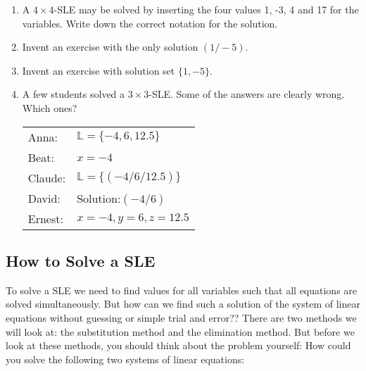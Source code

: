 \newpage
\begin{exer}$ $

\begin{enumerate}[label=\emph{\alph*})]
\item	A $4\times 4$-SLE may be solved by inserting the four values 1, -3, 4 and 17 for the variables. Write down the correct notation for the solution.
\vfill

\item	Invent an exercise with the only solution $(1 / -5)$.
\vfill

\item	Invent an exercise with solution set $\{1,-5\}$.
\vfill

\item	A few students solved a $3\times 3$-SLE. Some of the answers are clearly wrong. Which ones?

\begin{tabular}{ll}
Anna: & $\mathbb{L}=\{-4,6,12.5\}$\\ 
Beat: &$x=-4$\\ 
Claude:  &$\mathbb{L}=\{(-4/6/12.5)\}$\\
David:  &Solution:$(-4/6)$\\ 
Ernest:  &$x=-4, y=6, z=12.5$
\end{tabular}
\vfill
\end{enumerate}
\end{exer}



\newpage

\subsection{How to Solve a SLE}

To solve a SLE we need to find values for all variables such that all equations are solved simultaneously. But how can we find such a solution of the system of linear equations without guessing or simple trial and error?? There are two methods we will look at: the substitution method and the elimination method. But before we look at these methods, you should think about the problem yourself: How could you solve the following two systems of linear equations:


